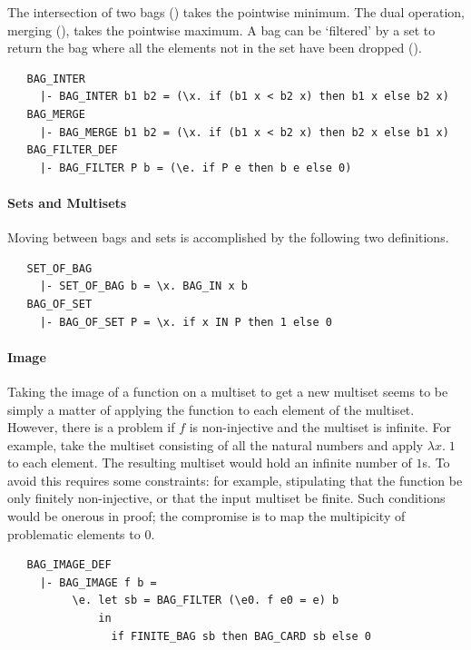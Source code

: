 The intersection of two bags () takes the pointwise
minimum. The dual operation, merging (), takes the
pointwise maximum. A bag can be `filtered' by a set to return the bag
where all the elements not in the set have been dropped
().
%
\begin{hol}
\begin{verbatim}
   BAG_INTER
     |- BAG_INTER b1 b2 = (\x. if (b1 x < b2 x) then b1 x else b2 x)
   BAG_MERGE
     |- BAG_MERGE b1 b2 = (\x. if (b1 x < b2 x) then b2 x else b1 x)
   BAG_FILTER_DEF
     |- BAG_FILTER P b = (\e. if P e then b e else 0)
\end{verbatim}
\end{hol}

\paragraph {Sets and Multisets}

Moving between bags and sets is accomplished by the following two
definitions.
%
\begin{hol}
\begin{verbatim}
   SET_OF_BAG
     |- SET_OF_BAG b = \x. BAG_IN x b
   BAG_OF_SET
     |- BAG_OF_SET P = \x. if x IN P then 1 else 0
\end{verbatim}
\end{hol}

\paragraph {Image}

Taking the image of a function on a multiset to get a new multiset
seems to be simply a matter of applying the function to each element
of the multiset. However, there is a problem if $f$ is non-injective
and the multiset is infinite. For example, take the multiset
consisting of all the natural numbers and apply $\lambda x.\; 1$ to
each element. The resulting multiset would hold an infinite number of
$1$s. To avoid this requires some constraints: for example,
stipulating that the function be only finitely non-injective, or that
the input multiset be finite. Such conditions would be onerous in
proof; the compromise is to map the multipicity of problematic
elements to $0$.
%
\begin{hol}
\begin{verbatim}
   BAG_IMAGE_DEF
     |- BAG_IMAGE f b =
          \e. let sb = BAG_FILTER (\e0. f e0 = e) b
              in
                if FINITE_BAG sb then BAG_CARD sb else 0
\end{verbatim}
\end{hol}


